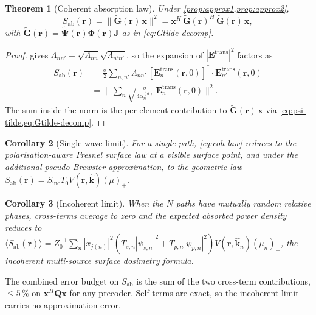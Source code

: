 \documentclass[journal,twocolumn,10pt]{IEEEtran}
\theoremstyle{plain}
\newtheorem{theorem}{Theorem}
\newtheorem{corollary}[theorem]{Corollary}
\theoremstyle{remark}
\newcommand{\khat}{\hat{\bm{k}}}
\newcommand{\rr}{\mathbf{r}}
\newcommand{\xx}{\mathbf{x}}
\newcommand{\Sinc}{S_{\mathrm{inc}}}
\newcommand{\Sab}{S_{\mathrm{ab}}}
\newcommand{\Gtil}{\tilde{\mathbf{G}}}
\newcommand{\Qmat}{\mathbf{Q}}
\newcommand{\Jmat}{\mathbf{J}}
\newcommand{\Phimat}{\mathbf{\Phi}}
\newcommand{\Psitil}{\tilde{\bm{\Psi}}}
\newcommand{\pospart}[1]{\left(#1\right)_{+}}
\newcommand{\Vis}{V}
\begin{document}
\begin{theorem}[Coherent absorption law]\label{thm:coh-law}
Under \cref{prop:approx1,prop:approx2},
\begin{equation}\label{eq:coh-law}
  \Sab(\rr) = \|\Gtil(\rr)\,\xx\|^2
  = \xx^H\,\Gtil(\rr)^H\,\Gtil(\rr)\,\xx,
\end{equation}
with $\Gtil(\rr) = \Psitil(\rr) \Phimat(\rr) \Jmat$ as in
\cref{eq:Gtilde-decomp}.
\end{theorem}

\begin{proof}
 gives
$\Lambda_{nn'} = \sqrt{\Lambda_{nn}}\sqrt{\Lambda_{n'n'}}$, so the
expansion of $|\mathbf{E}^{\mathrm{trans}}|^2$ factors as
\begin{equation*}
\begin{aligned}
  \Sab(\rr)
  &= \frac{\sigma}{2} \sum_{n,n'} \Lambda_{nn'}\,
  [\mathbf{E}_n^{\mathrm{trans}}(\rr, 0)]^* \cdot
  \mathbf{E}_{n'}^{\mathrm{trans}}(\rr, 0) \\
  &= \biggl\|\sum_n \sqrt{\frac{\sigma}{4\alpha_n^{(d)}}}\,
  \mathbf{E}_n^{\mathrm{trans}}(\rr, 0)\biggr\|^2.
\end{aligned}
\end{equation*}
The sum inside the norm is the per-element contribution to
$\Gtil(\rr)\,\xx$ via \cref{eq:psi-tilde,eq:Gtilde-decomp}.
\end{proof}

\begin{corollary}[Single-wave limit]\label{cor:single-wave}
For a single path, \cref{eq:coh-law} reduces to the
polarisation-aware Fresnel surface law at a visible surface point,
and under the additional pseudo-Brewster approximation, to the
geometric law $\Sab(\rr) = \Sinc T_0 \Vis(\rr,\khat) \pospart{\mu}$.
\end{corollary}

\begin{corollary}[Incoherent limit]\label{cor:incoherent}
When the $N$ paths have mutually random relative phases, cross-terms
average to zero and the expected absorbed power density reduces to
$\langle\Sab(\rr)\rangle = Z_0^{-1}\sum_n |x_{j(n)}|^2 (T_{s,n}
|\psi_{s,n}|^2 + T_{p,n} |\psi_{p,n}|^2) \Vis(\rr,\khat_n)
\pospart{\mu_n}$, the incoherent multi-source surface dosimetry
formula.
\end{corollary}

The combined error budget on $\Sab$ is the sum of the two
cross-term contributions, $\leq 5\,\%$ on $\xx^H \Qmat \xx$ for any
precoder. Self-terms are exact, so the incoherent limit carries no
approximation error.
\end{document}

